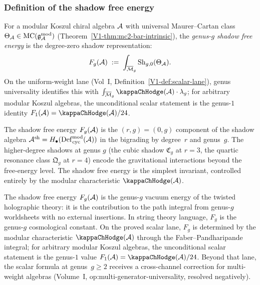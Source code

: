 \subsubsection{Definition of the shadow free energy}

\begin{definition}
For a modular Koszul chiral algebra $\mathcal{A}$ with universal Maurer--Cartan class $\Theta_{\mathcal{A}} \in \mathrm{MC}(\mathfrak{g}_{\mathcal{A}}^{\mathrm{mod}})$ (Theorem~\ref*{V1-thm:mc2-bar-intrinsic}), the \emph{genus-$g$ shadow free energy} is the degree-zero shadow representation:
\begin{equation}%
F_g(\cA) \;:=\; \int_{\overline{\mathcal{M}}_g} \operatorname{Sh}_{g,0}(\Theta_\cA).
\end{equation}
On the uniform-weight lane (Vol~I, Definition~\ref*{V1-def:scalar-lane}),
genus universality identifies this
with $\int_{\overline{\mathcal{M}}_g} \kappaChHodge(\cA)\cdot\lambda_g$; for
arbitrary modular Koszul algebras, the unconditional scalar statement
is the genus-$1$ identity $F_1(\cA)=\kappaChHodge(\cA)/24$.
\end{definition}

\begin{remark}
The shadow free energy $F_g(\mathcal{A})$ is the $(r,g) = (0,g)$ component of the shadow algebra $\mathcal{A}^{\mathrm{sh}} = H_\bullet(\operatorname{Def}_{\mathrm{cyc}}^{\mathrm{mod}}(\mathcal{A}))$ in the bigrading by degree~$r$ and genus~$g$. The higher-degree shadows at genus $g$ (the cubic shadow $\mathfrak{C}_g$ at $r = 3$, the quartic resonance class $\mathfrak{Q}_g$ at $r = 4$) encode the gravitational interactions beyond the free-energy level. The shadow free energy is the simplest invariant, controlled entirely by the modular characteristic $\kappaChHodge(\cA)$.
\end{remark}

\begin{remark}
The shadow free energy $F_g(\mathcal{A})$ is the genus-$g$ vacuum energy of the
twisted holographic theory: it is the contribution to the path integral
from genus-$g$ worldsheets with no external insertions. In string
theory language, $F_g$ is the genus-$g$ cosmological constant. On the
proved scalar lane, $F_g$ is determined by the modular
characteristic $\kappaChHodge(\cA)$ through the Faber--Pandharipande integral;
for arbitrary modular Koszul algebras, the unconditional scalar
statement is the genus-$1$ value $F_1(\cA)=\kappaChHodge(\cA)/24$. Beyond that
lane, the scalar formula at genus~$g \geq 2$ receives a
cross-channel correction for multi-weight algebras
\textup{(}Volume~I, op:multi-generator-universality, resolved negatively\textup{)}.
\end{remark}

